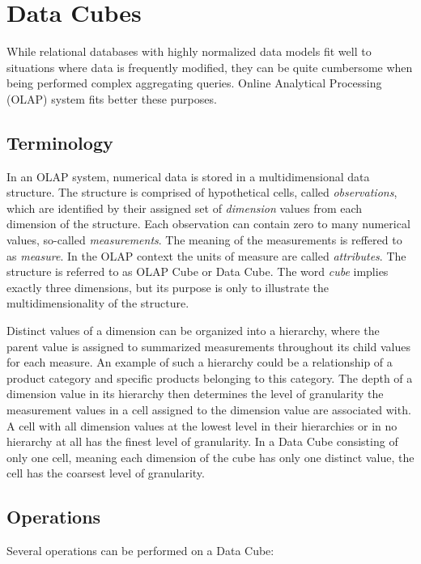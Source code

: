 \chapter{Data Cubes\label{datacubes}}

While relational databases with highly normalized data models fit well to situations where data is frequently modified, they can be quite cumbersome when being performed complex aggregating queries. Online Analytical Processing (OLAP) system fits better these purposes. 

\section{Terminology}

In an OLAP system, numerical data is stored in a multidimensional data structure. The structure is comprised of hypothetical cells, called \textit{observations}, which are identified by their assigned set of \textit{dimension} values from each dimension of the structure. Each observation can contain zero to many numerical values, so-called \textit{measurements}. The meaning of the measurements is reffered to as \textit{measure}. In the OLAP context the units of measure are called \textit{attributes}. The structure is referred to as OLAP Cube or Data Cube. The word \textit{cube} implies exactly three dimensions, but its purpose is only to illustrate the multidimensionality of the structure.

Distinct values of a dimension can be organized into a hierarchy, where the parent value is assigned to summarized measurements throughout its child values for each measure. An example of such a hierarchy could be a relationship of a product category and specific products belonging to this category. The depth of a dimension value in its hierarchy then determines the level of granularity the measurement values in a cell assigned to the dimension value are associated with. A cell with all dimension values at the lowest level in their hierarchies or in no hierarchy at all has the finest level of granularity. In a Data Cube consisting of only one cell, meaning each dimension of the cube has only one distinct value, the cell has the coarsest level of granularity.

\section{Operations}

Several operations can be performed on a Data Cube:

